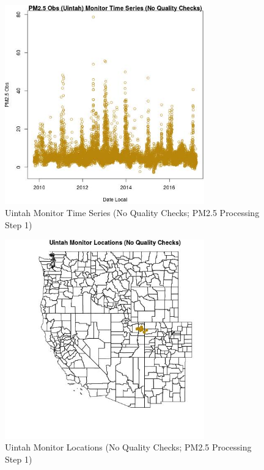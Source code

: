 
\begin{figure} 
\centering  
\includegraphics[width=0.77\textwidth]{Code_Outputs/PM25Source3TSstep1_PM25_ObsvDate_Local.jpg} 
\caption{\label{fig:PM25Source3TSstep1PM25_ObsvDate_Local}Uintah Monitor Time Series (No Quality Checks; PM2.5 Processing Step 1)} 
\end{figure} 
 

\begin{figure} 
\centering  
\includegraphics[width=0.77\textwidth]{Code_Outputs/PM25Source3TSstep1_MapUintahLocations.jpg} 
\caption{\label{fig:PM25Source3TSstep1MapUintahLocations}Uintah Monitor Locations (No Quality Checks; PM2.5 Processing Step 1)} 
\end{figure} 
 

